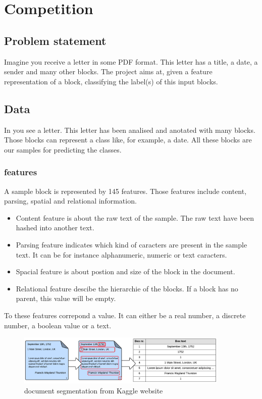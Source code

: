 




\section{Competition}

	\subsection{Problem statement}
	Imagine you receive a letter in some PDF format. This letter has a title, a date, a sender and many other blocks. The project aims at, given a feature representation of a block, classifying the label(s) of this input blocks.




	\subsection{Data}
		In  you see a letter. This letter has been analised and anotated with  many blocks. Those blocks can represent a class like, for example, a date. All these blocks are our samples for predicting the classes.

		\subsubsection{features}
			A sample block is represented by 145 features. Those features include content, parsing, spatial and relational information.

			\begin{itemize}
				\item Content feature is about the raw text of the sample. The raw text have been hashed into another text.
				\item Parsing feature indicates which kind of caracters are present in the sample text. It can be for instance alphanumeric, numeric or text caracters.
				\item Spacial feature is about postion and size of the block in the document.
			 	\item Relational feature descibe the hierarchie of the blocks. If a block has no parent, this value will be empty.
	\end{itemize}

		To these features correpond a value. It can either be a real number, a discrete number, a boolean value or a text.


	\begin{figure}[h]
		\begin{center}
			\includegraphics[width=0.9\textwidth]{FeatureExtraction1.png}
	    \end{center}
		\caption{document segmentation from Kaggle website \label{fig:FeatureExtraction1}}
	\end{figure}


